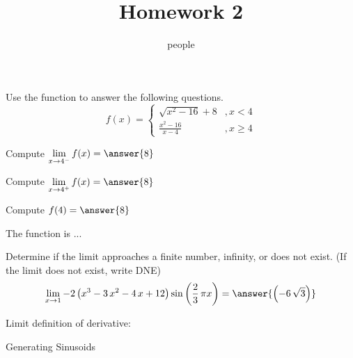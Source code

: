 \documentclass[•]{ximera}
\title{Homework 2}
\author{people}
\begin{document}
\maketitle


\begin{shuffle}[2]
\begin{exercise}

Use the function to answer the following questions.
\[f(x)=\left\{\begin{array}{ll}{{\sqrt{x^{2} - 16} + 8}}&,x<{{4}}\\[5pt]
{{\frac{x^{2} - 16}{x - 4}}}&,x\geq{{4}}
\end{array}\right.\]
\begin{shuffle}[4]
\begin{problem}
Compute $\lim\limits_{x\to{{4}}^-}f(x)=\answer{{{8}}}$\\[1in]
\end{problem}
\begin{problem}
Compute $\lim\limits_{x\to{{4}}^+}f(x)=\answer{{{8}}}$\\[1in]
\end{problem}
\begin{problem}
Compute $f({{4}})=\answer{{{8}}}$\\[1in]
\end{problem}
\begin{problem}
The function is ...
\begin{multipleChoice}
\end{multipleChoice}
\end{problem}
\end{shuffle}
\end{exercise}%





\begin{exercise}
Determine if the limit approaches a finite number, infinity, or does not exist. (If the limit does not exist, write DNE)
\[\lim_{x\to{{1}}}{{-2 \, {\left(x^{3} - 3 \, x^{2} - 4 \, x + 12\right)} \sin\left(\frac{2}{3} \, \pi x\right)}}=\answer{{{\left(-6 \, \sqrt{3}\right)}}}\]

\end{exercise}%
\end{shuffle}


Limit definition of derivative:

\vspace{0.5in}

Generating Sinusoids
\end{document}
